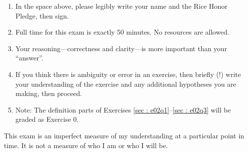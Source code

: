 \begin{enumerate}
\item In the space above, please legibly write your name and the Rice Honor Pledge, then sign.
\item Full time for this exam is exactly 50 minutes. No resources are allowed.
\item Your reasoning---correctness and clarity---is more important than your ``answer''.
\item If you think there is ambiguity or error in an exercise, then briefly (!) write your understanding of the exercise and any additional hypotheses you are making, then proceed.
\item Note: The definition parts of Exercises \ref{sec : e02q1}--\ref{sec : e02q3} will be graded as Exercise 0.
\end{enumerate}
This exam is an imperfect measure of my understanding at a particular point in time. It is not a measure of who I am or who I will be.
